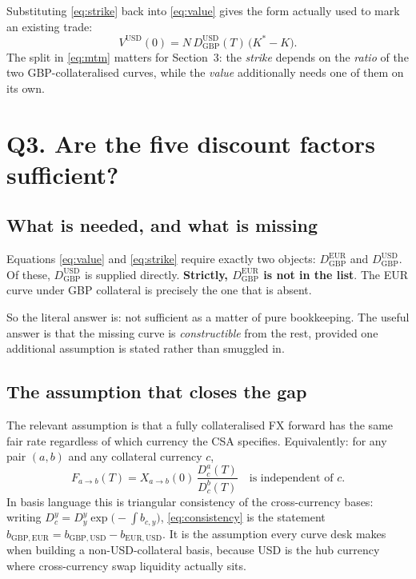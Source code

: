 \documentclass[11pt]{article}
\newcommand{\D}[2]{D_{#1}^{#2}}
\begin{document}
Substituting \eqref{eq:strike} back into \eqref{eq:value} gives the form actually used to
mark an existing trade:
\begin{equation}
  V^{\mathrm{USD}}(0) = N\,\D{\mathrm{GBP}}{\mathrm{USD}}(T)\,\bigl(K^\ast - K\bigr).
  \label{eq:mtm}
\end{equation}
The split in \eqref{eq:mtm} matters for Section~3: the \emph{strike} depends on the
\emph{ratio} of the two GBP-collateralised curves, while the \emph{value} additionally
needs one of them on its own.

\section{Q3. Are the five discount factors sufficient?}

\subsection{What is needed, and what is missing}

Equations \eqref{eq:value} and \eqref{eq:strike} require exactly two objects:
$\D{\mathrm{GBP}}{\mathrm{EUR}}$ and $\D{\mathrm{GBP}}{\mathrm{USD}}$. Of these,
$\D{\mathrm{GBP}}{\mathrm{USD}}$ is supplied directly. \textbf{Strictly,
$\D{\mathrm{GBP}}{\mathrm{EUR}}$ is not in the list}. The EUR curve under GBP
collateral is precisely the one that is absent.

So the literal answer is: not sufficient as a matter of pure bookkeeping. The useful
answer is that the missing curve is \emph{constructible} from the rest, provided one
additional assumption is stated rather than smuggled in.

\subsection{The assumption that closes the gap}

The relevant assumption is that a fully collateralised FX forward has the same fair rate
regardless of which currency the CSA specifies. Equivalently: for any pair $(a,b)$ and any
collateral currency $c$,
\begin{equation}
  F_{a\to b}(T) = X_{a\to b}(0)\,\frac{\D{c}{a}(T)}{\D{c}{b}(T)}
  \quad\text{is independent of } c.
  \label{eq:consistency}
\end{equation}
In basis language this is triangular consistency of the cross-currency bases: writing
$\D{c}{y} = \D{y}{y}\exp\bigl(-\!\int b_{c,y}\bigr)$, \eqref{eq:consistency} is the
statement $b_{\mathrm{GBP},\mathrm{EUR}} = b_{\mathrm{GBP},\mathrm{USD}} -
b_{\mathrm{EUR},\mathrm{USD}}$. It is the assumption every curve desk makes when building
a non-USD-collateral basis, because USD is the hub currency where cross-currency swap
liquidity actually sits.
\end{document}
